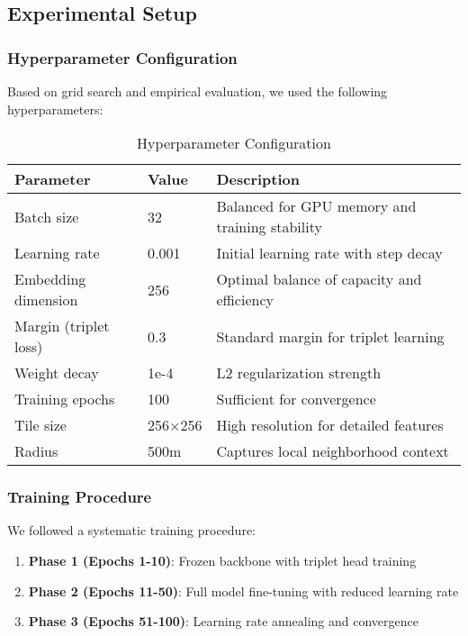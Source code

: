 \subsection{Experimental Setup}

\subsubsection{Hyperparameter Configuration}

Based on grid search and empirical evaluation, we used the following hyperparameters:

\begin{table}[H]
\centering
\caption{Hyperparameter Configuration}
\begin{tabular}{|l|l|l|}
\hline
\textbf{Parameter} & \textbf{Value} & \textbf{Description} \\
\hline
Batch size & 32 & Balanced for GPU memory and training stability \\
Learning rate & 0.001 & Initial learning rate with step decay \\
Embedding dimension & 256 & Optimal balance of capacity and efficiency \\
Margin (triplet loss) & 0.3 & Standard margin for triplet learning \\
Weight decay & 1e-4 & L2 regularization strength \\
Training epochs & 100 & Sufficient for convergence \\
Tile size & 256×256 & High resolution for detailed features \\
Radius & 500m & Captures local neighborhood context \\
\hline
\end{tabular}
\end{table}

\subsubsection{Training Procedure}

We followed a systematic training procedure:
\begin{enumerate}
    \item \textbf{Phase 1 (Epochs 1-10)}: Frozen backbone with triplet head training
    \item \textbf{Phase 2 (Epochs 11-50)}: Full model fine-tuning with reduced learning rate
    \item \textbf{Phase 3 (Epochs 51-100)}: Learning rate annealing and convergence
\end{enumerate}


